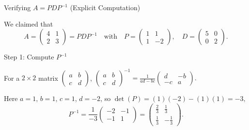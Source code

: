 \documentclass[aspectratio=169]{beamer}
\begin{document}
\begin{frame}{Verifying $A = P D P^{-1}$ (Explicit Computation)}

We claimed that 
\[
A =
\begin{pmatrix}
4 & 1\\
2 & 3
\end{pmatrix}
=
P D P^{-1}
\quad\text{with}\quad
P =
\begin{pmatrix}
1 & 1\\
1 & -2
\end{pmatrix},
\quad
D =
\begin{pmatrix}
5 & 0\\
0 & 2
\end{pmatrix}.
\]

\pause
\begin{block}{Step 1: Compute $P^{-1}$}
\vspace{2mm}

For a $2\times 2$ matrix 
$\begin{pmatrix}a & b\\ c & d\end{pmatrix}$,
$
\begin{pmatrix}a & b\\ c & d\end{pmatrix}^{-1}
= \frac{1}{ad-bc}
\begin{pmatrix}
d & -b\\
-c & a
\end{pmatrix}.
$


\vspace{1mm}
\noindent 
Here $a=1$, $b=1$, $c=1$, $d=-2$, so
$
\det(P)= (1)(-2) - (1)(1) = -3,
$
\[
P^{-1}
= \frac{1}{-3}
\begin{pmatrix}
-2 & -1\\
-1 & 1
\end{pmatrix}
=
\begin{pmatrix}
\frac{2}{3} & \frac{1}{3}\\[4pt]
\frac{1}{3} & -\frac{1}{3}
\end{pmatrix}.
\]
\end{block}
\end{frame}
\end{document}
